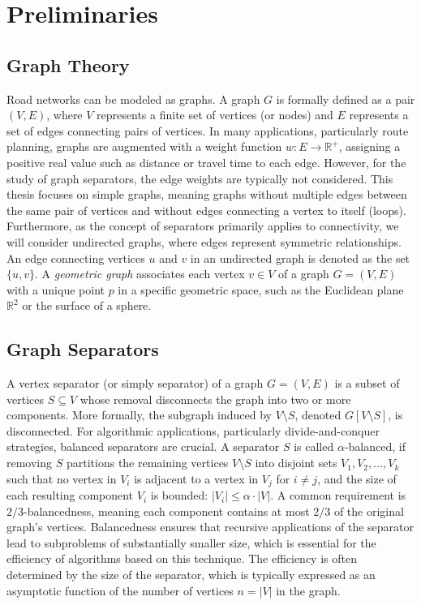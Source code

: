 \chapter{Preliminaries}
\label{ch:preliminaries}

\section{Graph Theory}
\label{sec:graphtheory}

Road networks can be modeled as graphs.
A graph \(G\) is formally defined as a pair \((V, E)\), where \(V\) represents a finite set of vertices (or nodes) and \(E\) represents a set of edges connecting pairs of vertices.
In many applications, particularly route planning, graphs are augmented with a weight function \(w: E \to \mathbb{R}^+\), assigning a positive real value such as distance or travel time to each edge.
However, for the study of graph separators, the edge weights are typically not considered.
This thesis focuses on simple graphs, meaning graphs without multiple edges between the same pair of vertices and without edges connecting a vertex to itself (loops).
Furthermore, as the concept of separators primarily applies to connectivity, we will consider undirected graphs, where edges represent symmetric relationships.
An edge connecting vertices \(u\) and \(v\) in an undirected graph is denoted as the set \(\{u,v\}\).
A \emph{geometric graph} associates each vertex \(v \in V\) of a graph \(G = (V, E)\) with a unique point \(p\) in a specific geometric space, such as the Euclidean plane \(\mathbb{R}^2\) or the surface of a sphere.

\section{Graph Separators}
\label{sec:graphseparators}

A vertex separator (or simply separator) of a graph \(G = (V, E)\) is a subset of vertices \(S \subseteq V\) whose removal disconnects the graph into two or more components.
More formally, the subgraph induced by \(V \setminus S\), denoted \(G[V \setminus S]\), is disconnected.
For algorithmic applications, particularly divide-and-conquer strategies, balanced separators are crucial.
A separator \(S\) is called \(\alpha\)-balanced, if removing \(S\) partitions the remaining vertices \(V \setminus S\) into disjoint sets \(V_1, V_2, \dots, V_k\) such that no vertex in \(V_i\) is adjacent to a vertex in \(V_j\) for \(i \neq j\), and the size of each resulting component \(V_i\) is bounded: \(|V_i| \le \alpha \cdot |V|\).
A common requirement is \(2/3\)-balancedness, meaning each component contains at most \(2/3\) of the original graph's vertices.
Balancedness ensures that recursive applications of the separator lead to subproblems of substantially smaller size, which is essential for the efficiency of algorithms based on this technique.
The efficiency is often determined by the size of the separator, which is typically expressed as an asymptotic function of the number of vertices \(n = |V|\) in the graph.
